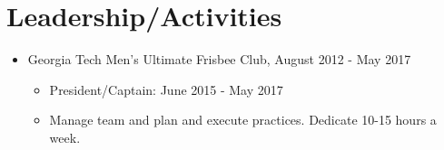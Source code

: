 \documentclass{resume_template}
\begin{document}
	\section{Leadership/Activities}
		
	\begin{itemize}[nosep, leftmargin=0.4cm]
	\item Georgia Tech Men's Ultimate Frisbee Club, August 2012 - May 2017
		\begin{itemize}[nosep]
		\item[] President/Captain: June 2015 - May 2017
		\item[] Manage team and plan and execute practices. Dedicate 10-15 hours a week.
		\end{itemize}
	\end{itemize}
\end{document}
